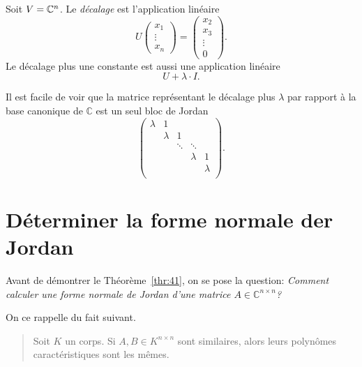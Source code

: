 \begin{definition}
  \label{def:36}
  Soit $V  = \mathbb{C}^n$. Le \emph{décalage}  est l'application linéaire 
  \begin{displaymath}
    U
    \begin{pmatrix}
      x_1 \\ \vdots \\ x_n
    \end{pmatrix}
     = 
     \begin{pmatrix}
       x_2 \\ x_3 \\ \vdots \\ 0
     \end{pmatrix}. 
  \end{displaymath}
  Le décalage plus une constante est aussi une application linéaire 
  \begin{displaymath}
    U + \lambda \cdot I. 
  \end{displaymath}
\end{definition}

Il est facile de voir que la matrice représentant le décalage plus $λ$ par rapport à la base canonique de $\mathbb{C}$ est 
un seul bloc de Jordan 
\begin{displaymath}
 \begin{pmatrix}
      λ & 1 \\
        & λ & 1 \\
        &   & \ddots & \ddots \\ 
        &   &             & λ & 1 \\
        &   &         &  & λ  \\
    \end{pmatrix}.   
\end{displaymath}




\section{Déterminer la forme normale der Jordan}
\label{sec:determiner-la-forme}

\noindent 
Avant de démontrer le Théorème~\ref{thr:41}, on se pose la question: \emph{Comment calculer une forme normale de Jordan d'une matrice $A ∈ ℂ^{n×n}$?}

On ce rappelle du fait suivant.
\begin{quote}
  Soit $K$ un corps. Si $A ,B ∈ K^{n ×n}$ sont similaires, alors leurs polynômes caractéristiques sont les mêmes. 
\end{quote}

